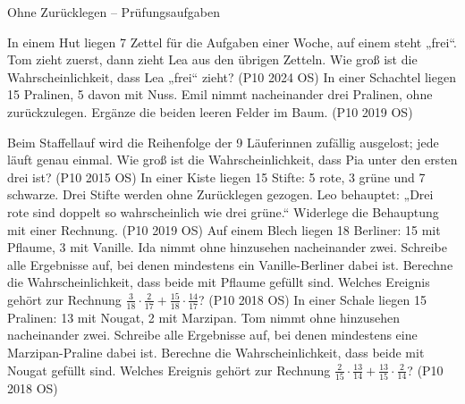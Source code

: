 \begin{aufgabe}{Ohne Zurücklegen – Prüfungsaufgaben}
\begin{teile}
\steil In einem Hut liegen 7 Zettel für die Aufgaben einer Woche, auf einem steht „frei“. Tom zieht zuerst, dann zieht Lea aus den übrigen Zetteln. Wie groß ist die Wahrscheinlichkeit, dass Lea „frei“ zieht? \hfill (P10 2024 OS)
\steil In einer Schachtel liegen 15 Pralinen, 5 davon mit Nuss. Emil nimmt nacheinander drei Pralinen, ohne zurückzulegen. Ergänze die beiden leeren Felder im Baum. \hfill (P10 2019 OS)

\steil Beim Staffellauf wird die Reihenfolge der 9 Läuferinnen zufällig ausgelost; jede läuft genau einmal. Wie groß ist die Wahrscheinlichkeit, dass Pia unter den ersten drei ist? \hfill (P10 2015 OS)
\steil In einer Kiste liegen 15 Stifte: 5 rote, 3 grüne und 7 schwarze. Drei Stifte werden ohne Zurücklegen gezogen. Leo behauptet: „Drei rote sind doppelt so wahrscheinlich wie drei grüne.“ Widerlege die Behauptung mit einer Rechnung. \hfill (P10 2019 OS)
\steil Auf einem Blech liegen 18 Berliner: 15 mit Pflaume, 3 mit Vanille. Ida nimmt ohne hinzusehen nacheinander zwei. Schreibe alle Ergebnisse auf, bei denen mindestens ein Vanille-Berliner dabei ist. Berechne die Wahrscheinlichkeit, dass beide mit Pflaume gefüllt sind. Welches Ereignis gehört zur Rechnung $\frac{3}{18} \cdot \frac{2}{17} + \frac{15}{18} \cdot \frac{14}{17}$? \hfill (P10 2018 OS)
\steil In einer Schale liegen 15 Pralinen: 13 mit Nougat, 2 mit Marzipan. Tom nimmt ohne hinzusehen nacheinander zwei. Schreibe alle Ergebnisse auf, bei denen mindestens eine Marzipan-Praline dabei ist. Berechne die Wahrscheinlichkeit, dass beide mit Nougat gefüllt sind. Welches Ereignis gehört zur Rechnung $\frac{2}{15} \cdot \frac{13}{14} + \frac{13}{15} \cdot \frac{2}{14}$? \hfill (P10 2018 OS)
\end{teile}
\end{aufgabe}
